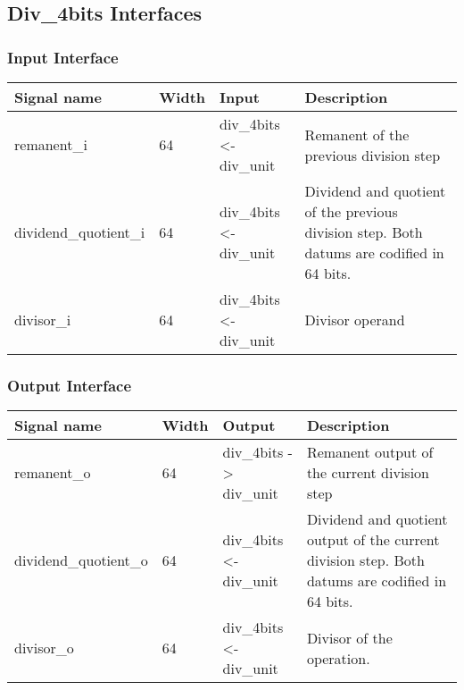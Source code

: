 
\subsection{ Div\_4bits Interfaces}

\subsubsection{Input Interface}

\begin{table}[H]
\centering
\begin{tabular}{l|l|l|p{8cm}}
\hline
\hline
Signal name & Width & Input & Description \\
\hline
\hline
remanent\_i & 64 & div\_4bits <- div\_unit & Remanent of the previous division step \\
\hline
dividend\_quotient\_i & 64 & div\_4bits <- div\_unit & Dividend and quotient of the previous division step. Both datums are codified in 64 bits. \\
\hline
divisor\_i & 64 & div\_4bits <- div\_unit & Divisor operand \\
\hline
\hline
\end{tabular}
\end{table}

\subsubsection{Output Interface}

\begin{table}[H]
\centering
\begin{tabular}{l|l|l|p{8cm}}
\hline
\hline
Signal name & Width & Output & Description \\
\hline
\hline
remanent\_o & 64 & div\_4bits -> div\_unit & Remanent output of the current division step \\
\hline
dividend\_quotient\_o & 64 & div\_4bits <- div\_unit & Dividend and quotient output of the current division step. Both datums are codified in 64 bits. \\
\hline
divisor\_o & 64 & div\_4bits <- div\_unit & Divisor of the operation. \\
\hline
\end{tabular}
\end{table}